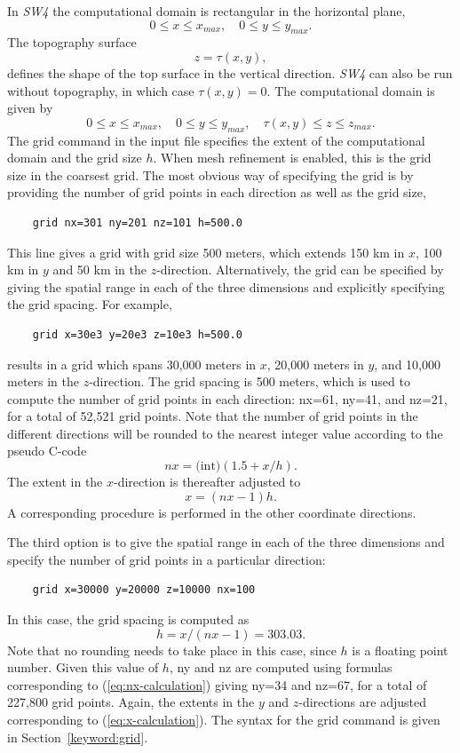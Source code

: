 \documentclass[11pt]{report}
\begin{document}
In \emph{SW4} the computational domain is rectangular in the horizontal plane,
\[
0\leq x\leq x_{max},\quad 0\leq y\leq y_{max}.
\]
The topography surface
\[
z=\tau(x,y),
\]
defines the shape of the top surface in the vertical direction. \emph{SW4} can also be run without
topography, in which case $\tau(x,y)=0$. The computational domain is given by
\begin{equation}\label{eq:domain}
0\leq x\leq x_{max},\quad 0\leq y\leq y_{max},\quad \tau(x,y) \leq z \leq z_{max}.
\end{equation}
The grid command in the input file specifies the extent of the computational domain and the grid
size $h$. When mesh refinement is enabled, this is the grid size in the coarsest grid. The most
obvious way of specifying the grid is by providing the number of grid points in each direction as
well as the grid size,
%
\begin{verbatim}
	grid nx=301 ny=201 nz=101 h=500.0 
\end{verbatim}
%
This line gives a grid with grid size 500 meters, which extends 150 km in $x$, 100 km in $y$ and 50 km in the
$z$-direction. Alternatively, the grid can be specified by giving the spatial range in each of the three
dimensions and explicitly specifying the grid spacing. For example,
%
\begin{verbatim}
	grid x=30e3 y=20e3 z=10e3 h=500.0 
\end{verbatim}
%
results in a grid which spans 30,000 meters in $x$, 20,000 meters in $y$, and 10,000
meters in the $z$-direction.  The grid spacing is 500 meters, which is used to compute the
number of grid points in each direction: nx=61, ny=41, and nz=21, for a total of
52,521 grid points. Note that the number of grid points in the different directions will be
rounded to the nearest integer value according to the pseudo C-code
\begin{equation}\label{eq:nx-calculation}
nx = \mbox{(int)} (1.5 + x/h).
\end{equation}
The extent in the $x$-direction is thereafter adjusted to
\begin{equation}\label{eq:x-calculation}
x=(nx-1) h.
\end{equation}
A corresponding procedure is performed in the other coordinate directions.

The third option is to give the spatial range in each of the three dimensions and specify the number
of grid points in a particular direction:
%
\begin{verbatim}
	grid x=30000 y=20000 z=10000 nx=100
\end{verbatim}
%
In this case, the grid spacing is computed as 
\[
h = x/(nx-1)= 303.03.
\]
Note that no rounding needs to take place in this case, since $h$ is a floating point number. Given this
value of $h$, ny and nz are computed using formulas corresponding to
(\ref{eq:nx-calculation}) giving ny=34 and nz=67, for a total of 227,800 grid points. Again,
the extents in the $y$ and $z$-directions are adjusted corresponding to (\ref{eq:x-calculation}). The syntax
for the grid command is given in Section~\ref{keyword:grid}.
\end{document}
